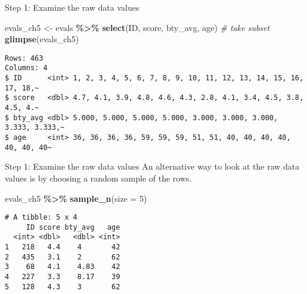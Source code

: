 \documentclass[
  ignorenonframetext,
]{beamer}
\newenvironment{Shaded}{\begin{snugshade}}{\end{snugshade}}
\newcommand{\AttributeTok}[1]{\textcolor[rgb]{0.13,0.29,0.53}{#1}}
\newcommand{\CommentTok}[1]{\textcolor[rgb]{0.56,0.35,0.01}{\textit{#1}}}
\newcommand{\DecValTok}[1]{\textcolor[rgb]{0.00,0.00,0.81}{#1}}
\newcommand{\FunctionTok}[1]{\textcolor[rgb]{0.13,0.29,0.53}{\textbf{#1}}}
\newcommand{\NormalTok}[1]{#1}
\newcommand{\OtherTok}[1]{\textcolor[rgb]{0.56,0.35,0.01}{#1}}
\newcommand{\SpecialCharTok}[1]{\textcolor[rgb]{0.81,0.36,0.00}{\textbf{#1}}}
\begin{document}
\begin{frame}[fragile]{Step 1: Examine the raw data values}
\protect\hypertarget{step-1-examine-the-raw-data-values}{}
\small

\begin{Shaded}
\begin{Highlighting}[]
\NormalTok{evals\_ch5 }\OtherTok{\textless{}{-}}\NormalTok{ evals }\SpecialCharTok{\%\textgreater{}\%}
  \FunctionTok{select}\NormalTok{(ID, score, bty\_avg, age)   }\CommentTok{\# take subset}
\FunctionTok{glimpse}\NormalTok{(evals\_ch5)}
\end{Highlighting}
\end{Shaded}

\begin{verbatim}
Rows: 463
Columns: 4
$ ID      <int> 1, 2, 3, 4, 5, 6, 7, 8, 9, 10, 11, 12, 13, 14, 15, 16, 17, 18,~
$ score   <dbl> 4.7, 4.1, 3.9, 4.8, 4.6, 4.3, 2.8, 4.1, 3.4, 4.5, 3.8, 4.5, 4.~
$ bty_avg <dbl> 5.000, 5.000, 5.000, 5.000, 3.000, 3.000, 3.000, 3.333, 3.333,~
$ age     <int> 36, 36, 36, 36, 59, 59, 59, 51, 51, 40, 40, 40, 40, 40, 40, 40~
\end{verbatim}

\normalsize
\end{frame}

\begin{frame}[fragile]{Step 1: Examine the raw data values}
\protect\hypertarget{step-1-examine-the-raw-data-values-1}{}
An alternative way to look at the raw data values is by choosing a
random sample of the rows.

\small

\begin{Shaded}
\begin{Highlighting}[]
\NormalTok{evals\_ch5 }\SpecialCharTok{\%\textgreater{}\%}
  \FunctionTok{sample\_n}\NormalTok{(}\AttributeTok{size =} \DecValTok{5}\NormalTok{)}
\end{Highlighting}
\end{Shaded}

\begin{verbatim}
# A tibble: 5 x 4
     ID score bty_avg   age
  <int> <dbl>   <dbl> <int>
1   218   4.4    4       42
2   435   3.1    2       62
3    68   4.1    4.83    42
4   227   3.3    8.17    39
5   128   4.3    3       62
\end{verbatim}

\normalsize
\end{frame}
\end{document}
